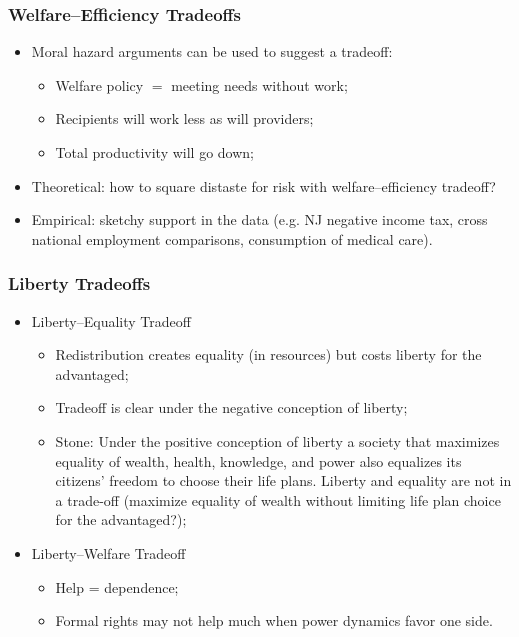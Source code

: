 \documentclass[aspectratio=169]{beamer}
\theoremstyle{principle}
\begin{document}
\begin{frame}
\frametitle{Welfare--Efficiency Tradeoffs}

\begin{itemize}
\item Moral hazard arguments can be used to suggest a tradeoff:
\begin{itemize}
\item Welfare policy $=$ meeting needs without work; 
\item Recipients will work less as will providers; 
\item Total productivity will go down;
\end{itemize}
\bigskip
\bigskip
\item Theoretical: how to square distaste for risk with welfare--efficiency tradeoff?
\bigskip
\bigskip
\item Empirical: sketchy support in the data (e.g. NJ negative income tax, cross national employment comparisons, consumption of medical care).
\end{itemize}

\end{frame}

\begin{frame}
\frametitle{Liberty Tradeoffs}
\begin{itemize}
\item Liberty--Equality Tradeoff
\begin{itemize}
\item Redistribution creates equality (in resources) but costs liberty for the advantaged;
\item Tradeoff is clear under the negative conception of liberty;
\item Stone: Under the positive conception of liberty a society that maximizes equality of wealth, health, knowledge, and power also equalizes its citizens' freedom to choose their life plans. Liberty and equality are not in a trade-off (maximize equality of wealth without limiting life plan choice for the advantaged?);
\end{itemize}
\bigskip
\bigskip
\item Liberty--Welfare Tradeoff
\begin{itemize}
\item Help = dependence;
\item Formal rights may not help much when power dynamics favor one side.
\end{itemize}
\end{itemize}

\end{frame}
\end{document}
